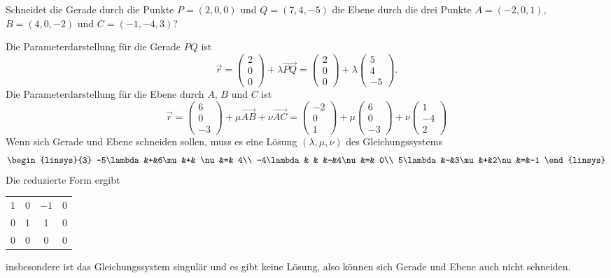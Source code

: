 Schneidet die Gerade durch die Punkte $P=(2,0,0)$ und $Q=(7,4,-5)$
die Ebene durch
die drei Punkte $A=(-2,0,1)$, $B=(4,0,-2)$ und $C=(-1,-4,3)$?


\begin{loesung}
Die Parameterdarstellung für die Gerade $PQ$ ist
\[
\vec r=
\begin{pmatrix} 2\\0\\0 \end{pmatrix}
+\lambda \overrightarrow{PQ}
=
\begin{pmatrix} 2\\0\\0 \end{pmatrix}
+\lambda
\begin{pmatrix}  5\\4\\-5\end{pmatrix}.
\]
Die Parameterdarstellung für die Ebene durch $A$, $B$ und $C$ ist
\[
\vec r
=
\begin{pmatrix}6\\0\\-3\end{pmatrix}
+\mu \overrightarrow{AB}
+\nu \overrightarrow{AC}
=
\begin{pmatrix}-2\\0\\1\end{pmatrix}
+\mu \begin{pmatrix}6\\0\\-3\end{pmatrix}
+\nu \begin{pmatrix}1\\-4\\2\end{pmatrix}
\]
Wenn sich Gerade und Ebene schneiden sollen, muss es eine Lösung
$(\lambda,\mu,\nu)$ des Gleichungssystems
\[
\begin{linsys}{3}
-5\lambda&+&6\mu&+& \nu&=& 4\\
-4\lambda& &    &-&4\nu&=& 0\\
5\lambda&-&3\mu&+&2\nu&=&-1
\end{linsys}
\]
Die reduzierte Form ergibt
\begin{center}
\begin{tabular}{|ccc|c|}
\hline
1&0&$-1$&0\\
0&1& 1&0\\
0&0& 0&0\\
\hline
\end{tabular}
\end{center}
insbesondere ist das Gleichungssystem singulär und es gibt keine
Lösung, also können sich Gerade und Ebene auch nicht schneiden.


\end{loesung}
